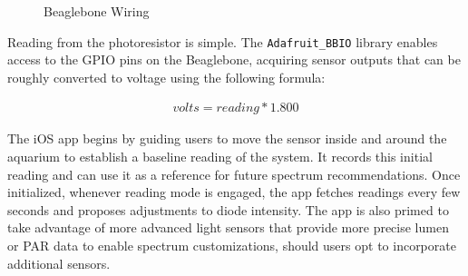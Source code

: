 \documentclass[8pt,twocolumn]{article}
\begin{document}
\begin{figure}[!htp]
    \centering
\end{figure}
\begin{figure}[!htp]
    \centering
    \caption{Beaglebone Wiring}
    \label{fig:bb_wiring}
\end{figure}


Reading from the photoresistor is simple. The \texttt{Adafruit\_BBIO} library enables access to the GPIO pins on the Beaglebone, acquiring sensor outputs that can be roughly converted to voltage using the following formula:

\begin{align*}
	volts = reading * 1.800
\end{align*}

The iOS app begins by guiding users to move the sensor inside and around the aquarium to establish a baseline reading of the system. It records this initial reading and can use it as a reference for future spectrum recommendations. Once initialized, whenever reading mode is engaged, the app fetches readings every few seconds and proposes adjustments to diode intensity. The app is also primed to take advantage of more advanced light sensors that provide more precise lumen or PAR data to enable spectrum customizations, should users opt to incorporate additional sensors.
\end{document}
